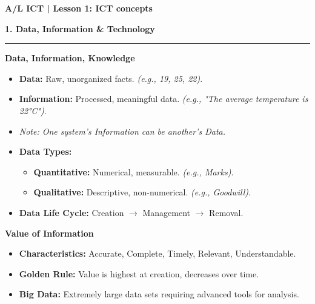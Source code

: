 \documentclass[a4paper, 8pt]{extarticle}
\newcommand{\sectionheading}[1]{\large\textbf{#1}\par\noindent\rule{\linewidth}{0.4pt}}
\newcommand{\subsectionheading}[1]{\normalsize\textbf{#1}}
\begin{document}
\pagestyle{empty} %

\begin{center}
    \fontsize{12pt}{14pt}\selectfont
    \textbf{A/L ICT | Lesson 1: ICT concepts}
\end{center}
\vspace{0.5em}

\begin{multicols}{2}


\sectionheading{1. Data, Information \& Technology}
\vspace{0.5em}
\subsectionheading{Data, Information, Knowledge}
\begin{itemize}
    \item \textbf{Data:} Raw, unorganized facts. \textit{(e.g., 19, 25, 22)}.
    \item \textbf{Information:} Processed, meaningful data. \textit{(e.g., "The average temperature is 22°C")}.
    \item \textit{Note: One system's Information can be another's Data.}
    \item \textbf{Data Types:}
        \begin{itemize}
            \item \textbf{Quantitative:} Numerical, measurable. \textit{(e.g., Marks)}.
            \item \textbf{Qualitative:} Descriptive, non-numerical. \textit{(e.g., Goodwill)}.
        \end{itemize}
    \item \textbf{Data Life Cycle:} Creation $\rightarrow$ Management $\rightarrow$ Removal.
\end{itemize}

\subsectionheading{Value of Information}
\begin{itemize}
    \item \textbf{Characteristics:} Accurate, Complete, Timely, Relevant, Understandable.
    \item \textbf{Golden Rule:} Value is highest at creation, decreases over time.
    \item \textbf{Big Data:} Extremely large data sets requiring advanced tools for analysis.
\end{itemize}


\end{multicols}
\end{document}
